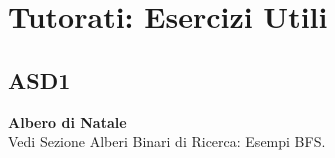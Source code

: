 \documentclass[../cheatSheetAlgoritmi.tex]{subfiles}
\begin{document}
\section{Tutorati: Esercizi Utili}
\subsection{ASD1}
\textbf{Albero di Natale}\\
Vedi Sezione Alberi Binari di Ricerca: Esempi BFS.
\end{document}
